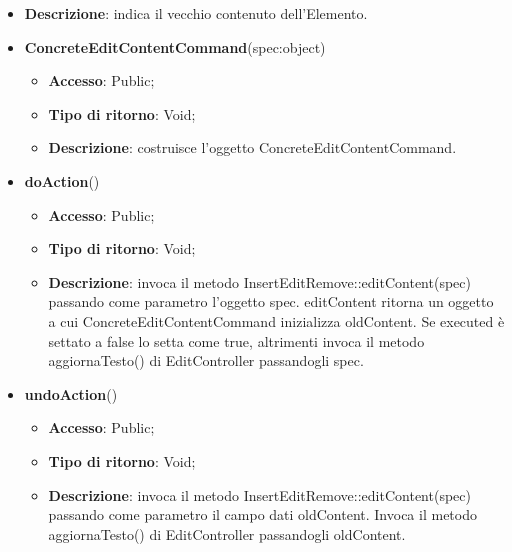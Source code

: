 {{{\begin{itemize}
\begin{itemize}
\begin{itemize}
\begin{itemize}
					\item \textbf{Descrizione}: indica il vecchio contenuto dell’Elemento.
				\end{itemize}
			\end{itemize}
				\end{itemize}
				\end{itemize}
			\begin{itemize}
				\item \textbf{ConcreteEditContentCommand}(spec:object)
				\begin{itemize}
					\item \textbf{Accesso}: Public;
					\item \textbf{Tipo di ritorno}: Void;
					\item \textbf{Descrizione}: costruisce l’oggetto ConcreteEditContentCommand.
				\end{itemize}
				\item \textbf{doAction}()
				\begin{itemize}
					\item \textbf{Accesso}: Public;
					\item \textbf{Tipo di ritorno}: Void;
					\item \textbf{Descrizione}: invoca il metodo InsertEditRemove::editContent(spec) passando come parametro l'oggetto spec. editContent ritorna un oggetto a cui ConcreteEditContentCommand inizializza oldContent. Se executed è settato a false lo setta come true, altrimenti invoca il metodo aggiornaTesto() di EditController passandogli spec.
				\end{itemize}
				\item \textbf{undoAction}()
				\begin{itemize}
					\item \textbf{Accesso}: Public;
					\item \textbf{Tipo di ritorno}: Void;
					\item \textbf{Descrizione}: invoca il metodo InsertEditRemove::editContent(spec) passando come parametro il campo dati oldContent. Invoca il metodo aggiornaTesto() di EditController passandogli oldContent.
				\end{itemize}
			\end{itemize}
			}

}}
